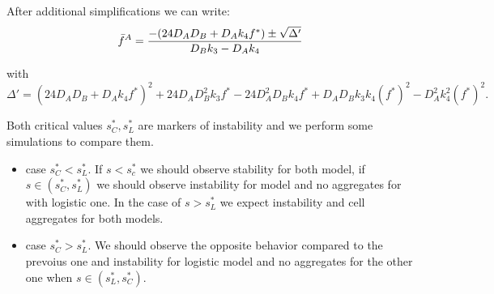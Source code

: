 After additional simplifications we can write:
\begin{equation}
{\bar{f}^A}=\frac{-(24 D_AD_B+D_Ak_4f^{*}) \pm \sqrt{\Delta'}}{D_Bk_3-D_Ak_4}  
\end{equation}

with $\Delta'=(24D_AD_B+D_Ak_4f^{*})^2+24D_AD_B^{2}k_3f^{*}-24D_A^2D_Bk_4f^{*}+D_A D_B k_3 k_4(f^{*})^{2}-D_A^{2} k_4^2 (f^{*})^2.  $

Both critical values $s^{*}_C, s^{*}_L$ are markers of instability and we perform some simulations to compare them.

\begin{itemize}
	\item case $s^{*}_{C}<s^*_{L}$. If $s< s^{*}_{c}$ we should observe stability for both model, if $s \in (s^{*}_C, s^{*}_L)$ we should observe instability for model and no aggregates for with logistic one. In the case of $s>s^{*}_{L}$ we expect instability and cell aggregates for both models. 
	\item case $s^{*}_{C}>s^*_{L}$. We should observe the opposite behavior compared to the prevoius one and instability for logistic model and no aggregates for the other one when  $s \in (s^{*}_L, s^{*}_C)$.
\end{itemize}

